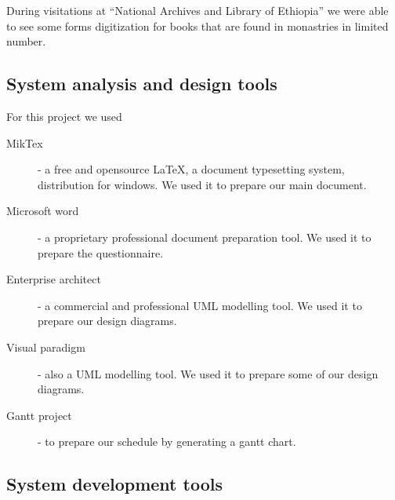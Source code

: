 During visitations at ``National Archives and Library of Ethiopia'' we were able to see some forms digitization for books that are found in monastries in limited number.

		\subsection{System analysis and design tools}

For this project we used 

\begin{description}
	\item[MikTex] - a free and opensource \LaTeX, a document typesetting system, distribution for windows. We used it to prepare our main document.
   \item[Microsoft word] - a proprietary professional document preparation tool. We used it to prepare the questionnaire.
	\item[Enterprise architect] - a commercial and professional UML modelling tool. We used it to prepare our design diagrams.
	\item[Visual paradigm] - also a UML modelling tool. We used it to prepare some of our design diagrams.
	\item[Gantt project] - to prepare our schedule by generating a gantt chart.
\end{description}

		\subsection{System development tools}

